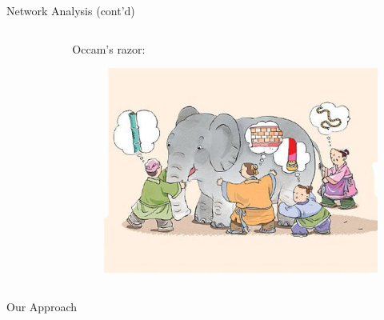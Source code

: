 \documentclass{beamer}
\begin{document}
\begin{frame}{Network Analysis (cont'd)}
\begin{columns}
\begin{column}[t]{.48\textwidth}
\begin{figure}[ht]
				\caption*{\label{fig:correlation-causation}}
			\end{figure}
		\end{column}
		\begin{column}[t]{.48\textwidth}
			Occam's razor:
			\begin{figure}[ht]
				\centering
				\includegraphics[width=1\textwidth,height=0.7\textheight]{figures/elephant.jpg}
				\caption*{\label{fig:elephant}}
			\end{figure}
		\end{column}
	\end{columns}
  \end{frame}
  \begin{frame}{Our Approach}
	\begin{figure}[ht]
	  \centering
	  \scalebox{0.7}{}
	\end{figure}

\end{frame}
\end{document}
